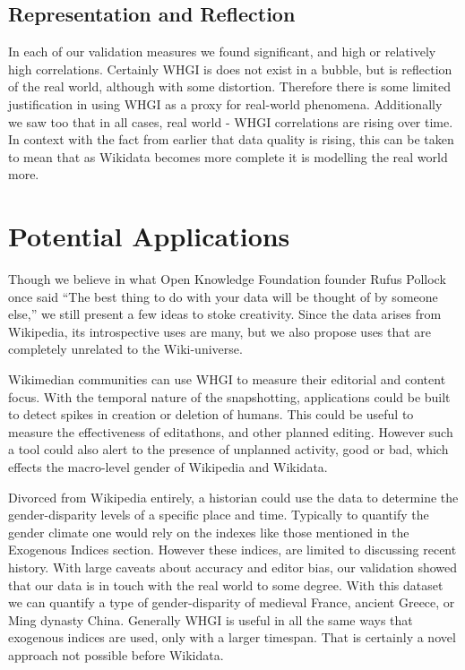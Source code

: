 \documentclass[letterpaper]{article}
\begin{document}
\subsection{Representation and Reflection}
In each of our validation measures we found significant, and high or relatively high correlations. Certainly WHGI is does not exist in a bubble, but is reflection of the real world, although with some distortion. Therefore there is some limited justification in using WHGI as a proxy for real-world phenomena. Additionally we saw too that in all cases, real world - WHGI correlations are rising over time. In context with the fact from earlier that data quality is rising, this can be taken to mean that as Wikidata becomes more complete it is modelling the real world more.

\section{Potential Applications}
Though we believe in what Open Knowledge Foundation founder Rufus Pollock once said ``The best thing to do with your data will be thought of by someone else,'' we still present a few ideas to stoke creativity. Since the data arises from Wikipedia, its introspective uses are many, but we also propose uses that are completely unrelated to the Wiki-universe. 

Wikimedian communities can use WHGI to measure their editorial and content focus. With the temporal nature of the snapshotting, applications could be built to detect spikes in creation or deletion of humans. This could be useful to measure the effectiveness of editathons, and other planned editing. However such a tool could also alert to the presence of unplanned activity, good or bad, which effects the macro-level gender of Wikipedia and Wikidata.

Divorced from Wikipedia entirely, a historian could use the data to determine the gender-disparity levels of a specific place and time. Typically to quantify the gender climate one would rely on the indexes like those mentioned in the Exogenous Indices section. However these indices, are limited to discussing recent history. With large caveats about accuracy and editor bias, our validation showed that our data is in touch with the real world to some degree. With this dataset we can quantify a type of gender-disparity of medieval France, ancient Greece, or Ming dynasty China. Generally WHGI is useful in all the same ways that exogenous indices are used, only with a larger timespan. That is certainly a novel approach not possible before Wikidata.
\end{document}
